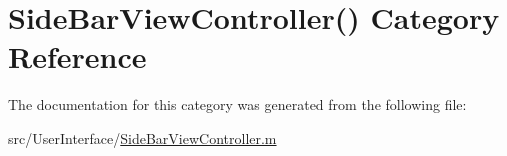 \hypertarget{category_side_bar_view_controller_07_08}{\section{Side\-Bar\-View\-Controller() Category Reference}
\label{category_side_bar_view_controller_07_08}
}


The documentation for this category was generated from the following file\-:\begin{DoxyCompactItemize}
\item 
src/\-User\-Interface/\hyperlink{_side_bar_view_controller_8m}{Side\-Bar\-View\-Controller.\-m}\end{DoxyCompactItemize}
